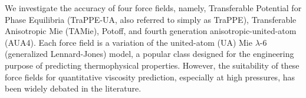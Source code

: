 \documentclass[preprint,review,12pt]{elsarticle}
\begin{document}
	 We investigate the accuracy of four force fields, namely, Transferable Potential for Phase Equilibria (TraPPE-UA, also referred to simply as TraPPE), Transferable Anisotropic Mie (TAMie), Potoff, and fourth generation anisotropic-united-atom (AUA4). Each force field is a variation of the united-atom (UA) Mie $\lambda$-6 (generalized Lennard-Jones) model, a popular class designed for the engineering purpose of predicting thermophysical properties. However, the suitability of these force fields for quantitative viscosity prediction, especially at high pressures, has been widely debated in the literature.
	 
	
	
	
	
	
\end{document}
